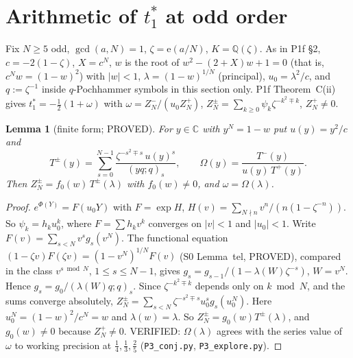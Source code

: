 \documentclass[11pt]{article}
\newtheorem{lemma}[theorem]{Lemma}
\theoremstyle{remark}
\newcommand{\Q}{\mathbb Q}
\newcommand{\e}{\mathrm e}
\begin{document}
\section{Arithmetic of $t_1^\ast$ at odd order}

Fix $N\ge5$ odd, $\gcd(a,N)=1$, $\zeta=\e(a/N)$, $K=\Q(\zeta)$. As in P1f \S2, $c=-2(1-\zeta)$, $X=c^N$,
$w$ is the root of $w^2-(2+X)w+1=0$ (that is, $c^Nw=(1-w)^2$) with $|w|<1$, $\lambda=(1-w)^{1/N}$
(principal), $u_0=\lambda^2/c$, and $q:=\zeta^{-1}$ inside $q$-Pochhammer symbols in this section only.
P1f Theorem~C(ii) gives $t_1^\ast=-\frac12(1+\omega)$ with $\omega=Z^-_N/(u_0Z^+_N)$,
$Z^\pm_N=\sum_{k\ge0}\psi_k\zeta^{-k^2\mp k}$, $Z_N^+\ne0$.

\begin{lemma}[finite form; PROVED]\label{lem:finite}
For $y\in\mathbb C$ with $y^N=1-w$ put $u(y)=y^2/c$ and
\[
   T^\pm(y)=\sum_{s=0}^{N-1}\frac{\zeta^{-s^2\mp s}\,u(y)^s}{(yq;q)_s},\qquad
   \Omega(y)=\frac{T^-(y)}{u(y)\,T^+(y)} .
\]
Then $Z^\pm_N=f_0(w)\,T^\pm(\lambda)$ with $f_0(w)\ne0$, and $\omega=\Omega(\lambda)$.
\end{lemma}
\begin{proof}
$e^{\Phi(Y)}=F(u_0Y)$ with $F=\exp H$, $H(v)=\sum_{N\nmid n}v^n/(n(1-\zeta^{-n}))$. So $\psi_k=h_ku_0^k$, where
$F=\sum h_kv^k$ converges on $|v|<1$ and $|u_0|<1$. Write $F(v)=\sum_{s<N}v^sg_s(v^N)$. The functional
equation $(1-\zeta v)F(\zeta v)=(1-v^N)^{1/N}F(v)$ (S0 Lemma~tel, PROVED), compared in the class
$v^{s\bmod N}$, $1\le s\le N-1$, gives $g_s=g_{s-1}/(1-\lambda(W)\zeta^{-s})$, $W=v^N$. Hence
$g_s=g_0/(\lambda(W)q;q)_s$. Since $\zeta^{-k^2\mp k}$ depends only on $k\bmod N$, and the sums converge
absolutely,
$Z^\pm_N=\sum_{s<N}\zeta^{-s^2\mp s}u_0^sg_s(u_0^N)$. Here $u_0^N=(1-w)^2/c^N=w$ and $\lambda(w)=\lambda$.
So $Z^\pm_N=g_0(w)T^\pm(\lambda)$, and $g_0(w)\ne0$ because $Z^+_N\ne0$. VERIFIED: $\Omega(\lambda)$ agrees
with the series value of $\omega$ to working precision at $\frac14,\frac13,\frac25$ (\texttt{P3\_conj.py},
\texttt{P3\_explore.py}).
\end{proof}
\end{document}
